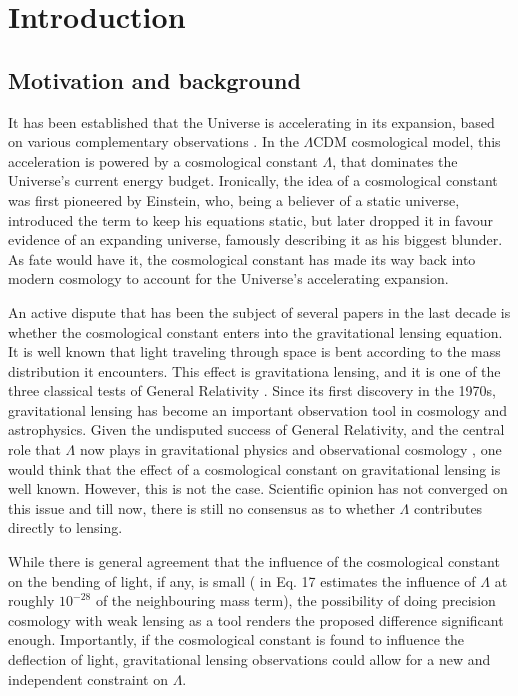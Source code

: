 \chapter{Introduction}


\section{Motivation and background}

It has been established that the Universe is accelerating in its expansion, based on various complementary observations \citep{riess2004type,spergel2003first}. In the $\Lambda \text{CDM}$ cosmological model, this acceleration is powered by a cosmological constant $\Lambda$, that dominates the Universe's current energy budget. Ironically, the idea of a cosmological constant was first pioneered by Einstein, who, being a believer of a static universe, introduced the term to keep his equations static, but later dropped it in favour evidence of an expanding universe, famously describing it as his biggest blunder. As fate would have it, the cosmological constant has made its way back into modern cosmology to account for the Universe's accelerating expansion. 

An active dispute that has been the subject of several papers in the last decade is whether the cosmological constant enters into the gravitational lensing equation. It is well known that light traveling through space is bent according to the mass distribution it encounters. This effect is gravitationa lensing, and it is one of the three classical tests of General Relativity \cite{will1993theory}. Since its first discovery in the 1970s, gravitational lensing has become an important observation tool in cosmology and astrophysics. Given the undisputed success of General Relativity, and the central role that $\Lambda$ now plays in gravitational physics and observational cosmology \citep{peebles2003cosmological}, one would think that the effect of a cosmological constant on gravitational lensing is well known. However, this is not the case. Scientific opinion has not converged on this issue and till now, there is still no consensus as to whether $\Lambda$ contributes directly to lensing. 

While there is general agreement that the influence of the cosmological constant on the bending of light, if any, is small (\citet{rindler2007contribution} in Eq. 17 estimates the influence of $\Lambda$ at roughly $10^{-28}$ of the neighbouring mass term), the possibility of doing precision cosmology with weak lensing as a tool renders the proposed difference significant enough. Importantly, if the cosmological constant is found to influence the deflection of light, gravitational lensing observations could allow for a new and independent constraint on $\Lambda$.

